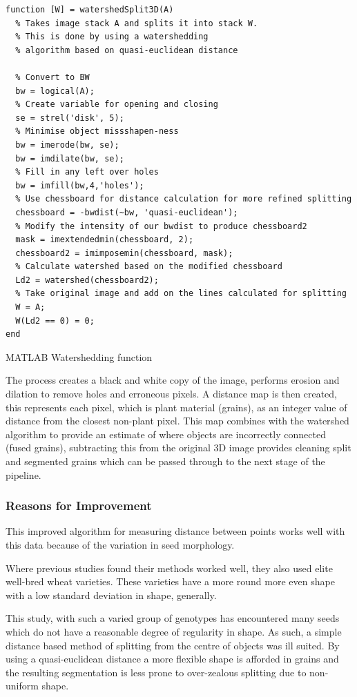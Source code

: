 \documentclass[11pt]{report}
\begin{document}
\begin{listing}[htbp]
\begin{verbatim}
function [W] = watershedSplit3D(A)
  % Takes image stack A and splits it into stack W.
  % This is done by using a watershedding
  % algorithm based on quasi-euclidean distance

  % Convert to BW
  bw = logical(A);
  % Create variable for opening and closing
  se = strel('disk', 5);
  % Minimise object missshapen-ness
  bw = imerode(bw, se);
  bw = imdilate(bw, se);
  % Fill in any left over holes
  bw = imfill(bw,4,'holes');
  % Use chessboard for distance calculation for more refined splitting
  chessboard = -bwdist(~bw, 'quasi-euclidean');
  % Modify the intensity of our bwdist to produce chessboard2
  mask = imextendedmin(chessboard, 2);
  chessboard2 = imimposemin(chessboard, mask);
  % Calculate watershed based on the modified chessboard
  Ld2 = watershed(chessboard2);
  % Take original image and add on the lines calculated for splitting
  W = A;
  W(Ld2 == 0) = 0;
end
\end{verbatim}
\caption{\label{org02a993c}
MATLAB Watershedding function}
\end{listing}

The process creates a black and white copy of the image, performs erosion and dilation to remove holes and erroneous pixels. A distance map is then created, this represents each pixel, which is plant material (grains), as an integer value of distance from the closest non-plant pixel. This map combines with the watershed algorithm to provide an estimate of where objects are incorrectly connected (fused grains), subtracting this from the original 3D image provides cleaning split and segmented grains which can be passed through to the next stage of the pipeline.

\subsubsection{Reasons for Improvement}
\label{sec:orgfeeab30}

This improved algorithm for measuring distance between points works well with this data because of the variation in seed morphology.

Where previous studies \cite{Hughes2017} found their methods worked well, they also used elite well-bred wheat varieties. These varieties have a more round more even shape with a low standard deviation in shape, generally.

This study, with such a varied group of genotypes has encountered many seeds which do not have a reasonable degree of regularity in shape. As such, a simple distance based method of splitting from the centre of objects was ill suited. By using a quasi-euclidean distance a more flexible shape is afforded in grains and the resulting segmentation is less prone to over-zealous splitting due to non-uniform shape.
\end{document}
